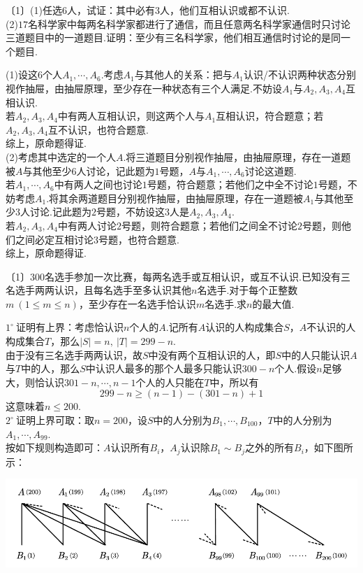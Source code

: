 \documentclass[cn,hazy,black,10pt,normal]{elegantnote}
\newcommand{\nd}[1]{〔#1〕}
\newcommand{\buzhou}[1]{$#1^{\circ} \ $}
\begin{document}
\begin{problem} %
	\nd{1}(1)任选$6$人，试证：其中必有$3$人，他们互相认识或都不认识. \\
	(2)$17$名科学家中每两名科学家都进行了通信，而且任意两名科学家通信时只讨论三道题目中的一道题目.证明：至少有三名科学家，他们相互通信时讨论的是同一个题目.
\end{problem}
\begin{solution}
	(1)设这$6$个人$A_1, \cdots ,A_6$.考虑$A_1$与其他人的关系：把与$A_1$认识/不认识两种状态分别视作抽屉，由抽屉原理，至少存在一种状态有三个人满足.不妨设$A_1$与$A_2,A_3,A_4$互相认识. \\
	若$A_2,A_3,A_4$中有两人互相认识，则这两个人与$A_1$互相认识，符合题意；若$A_2,A_3,A_4$互不认识，也符合题意. \\ 
	综上，原命题得证. \\
	(2)考虑其中选定的一个人$A$.将三道题目分别视作抽屉，由抽屉原理，存在一道题被$A$与其他至少$6$人讨论，记此题为$1$号题，$A$与$A_1, \cdots ,A_6$讨论这道题. \\
	若$A_1, \cdots ,A_6$中有两人之间也讨论$1$号题，符合题意；若他们之中全不讨论$1$号题，不妨考虑$A_1$.将其余两道题目分别视作抽屉，由抽屉原理，存在一道题被$A_1$与其他至少$3$人讨论.记此题为$2$号题，不妨设这$3$人是$A_2,A_3,A_4$. \\
	若$A_2,A_3,A_4$中有两人讨论$2$号题，则符合题意；若他们之间全不讨论$2$号题，则他们之间必定互相讨论$3$号题，也符合题意. \\
	综上，原命题得证.
\end{solution}

\begin{problem} %
	\nd{1}$300$名选手参加一次比赛，每两名选手或互相认识，或互不认识.已知没有三名选手两两认识，且每名选手至多认识其他$n$名选手.对于每个正整数$m~(1 \leq m \leq n)$，至少存在一名选手恰认识$m$名选手.求$n$的最大值.
\end{problem}
\begin{solution}
	\buzhou{1}证明有上界：考虑恰认识$n$个人的$A$.记所有$A$认识的人构成集合$S$，$A$不认识的人构成集合$T$，那么$|S|=n,~|T|=299-n$. \\
	由于没有三名选手两两认识，故$S$中没有两个互相认识的人，即$S$中的人只能认识$A$与$T$中的人，那么$S$中认识人最多的那个人最多只能认识$300-n$个人.假设$n$足够大，则恰认识$301-n, \cdots ,n-1$个人的人只能在$T$中，所以有$$299-n \geq (n-1) - (301-n) + 1$$
	这意味着$n \leq 200$. \\
	\buzhou{2}证明上界可取：取$n=200$，设$S$中的人分别为$B_1, \cdots , B_{100}$，$T$中的人分别为$A_1, \cdots ,A_{99}$. \\
	按如下规则构造即可：$A$认识所有$B_i$，$A_j$认识除$B_1 \sim B_{j}$之外的所有$B_i$，如下图所示：
	\begin{center}
		\includegraphics[width=14cm]{attachment/20230207.pdf}
	\end{center}
\end{solution}
\end{document}
